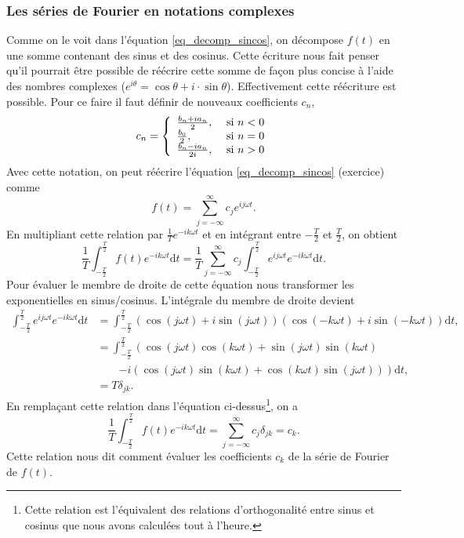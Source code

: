 \documentclass[a4paper,12pt]{book}
\newcommand{\dd}{\mathrm{d}}
\renewcommand{\eqref}[1]{\ref{#1}}
\begin{document}
\subsubsection{Les séries de Fourier en notations complexes}
Comme on le voit dans l'équation \eqref{eq_decomp_sincos}, on décompose $f(t)$ en une somme contenant des sinus et des cosinus. 
Cette écriture nous fait penser qu'il pourrait être possible de réécrire cette somme de façon plus concise à l'aide des nombres complexes
($e^{i\theta}=\cos\theta+i\cdot\sin\theta$). Effectivement cette réécriture est possible. Pour ce faire il faut définir 
de nouveaux coefficients $c_n$,
\begin{equation}
 c_n=\left\{\begin{array}{ll}
                \frac{b_n+ia_n}{2}, & $\mbox{ si }$n<0\\
                \frac{b_0}{2},      & $\mbox{ si }$n=0\\
                \frac{b_n-ia_n}{2i}, & $\mbox{ si }$n>0
               \end{array}\right.
\end{equation}
Avec cette notation, on peut réécrire l'équation \eqref{eq_decomp_sincos} (exercice) comme
\begin{equation}
 f(t)=\sum_{j=-\infty}^\infty c_je^{ij\omega t}.
\end{equation}
En multipliant cette relation par $\frac{1}{T}e^{-ik\omega t}$ et en intégrant entre $-\frac{T}{2}$ et $\frac{T}{2}$, 
on obtient
\begin{equation}
 \frac{1}{T}\int_{-\frac{T}{2}}^{\frac{T}{2}}f(t)e^{-ik\omega t}\dd t=\frac{1}{T}\sum_{j=-\infty}^\infty c_j\int_{-\frac{T}{2}}^{\frac{T}{2}}e^{ij\omega t}e^{-ik\omega t}\dd t.
\end{equation}
Pour évaluer le membre de droite de cette équation nous transformer les exponentielles en sinus/cosinus. L'intégrale du membre de droite devient
\begin{align}
\int_{-\frac{T}{2}}^{\frac{T}{2}}e^{ij\omega t}e^{-ik\omega t}\dd t&=\int_{-\frac{T}{2}}^{\frac{T}{2}}\left(\cos(j\omega t)+i\sin(j\omega t)\right)\left(\cos(-k\omega t)+i\sin(-k\omega t)\right)\dd t,\nonumber\\
&=\int_{-\frac{T}{2}}^{\frac{T}{2}}\left(\cos(j\omega t)\cos(k\omega t)+\sin(j\omega t)\sin(k\omega t)\right.\nonumber\\
&\quad\quad\left.-i(\cos(j\omega t)\sin(k\omega t)+\cos(k\omega t)\sin(j\omega t))\right)\dd t,\nonumber\\
&=T\delta_{jk}.
\end{align}
En remplaçant cette relation dans l'équation ci-dessus\footnote{Cette relation est l'équivalent des relations d'orthogonalité entre sinus et cosinus que nous avons calculées tout à l'heure.}, 
on a
\begin{equation}
 \frac{1}{T}\int_{-\frac{T}{2}}^{\frac{T}{2}}f(t)e^{-ik\omega t}\dd t=\sum_{j=-\infty}^\infty c_j\delta_{jk}=c_k.\label{eq_ck}
\end{equation}
Cette relation nous dit comment évaluer les coefficients $c_k$ de la série de Fourier de $f(t)$.
\end{document}

